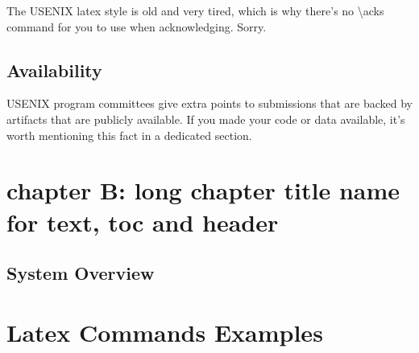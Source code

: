 The USENIX latex style is old and very tired, which is why there's no \textbackslash{}acks command for you to use when acknowledging. Sorry.\par

\section*{Availability}

USENIX program committees give extra points to submissions that are backed by artifacts that are publicly available. If you made your code or data available, it's worth mentioning this fact in a dedicated section.\par

\chapter[chapter B: manage long chap name]{chapter B: long chapter title name for text, toc and header}
\lipsum[8-12]

\section{System Overview}
\lipsum[9-13]

\chapter{Latex Commands Examples}

